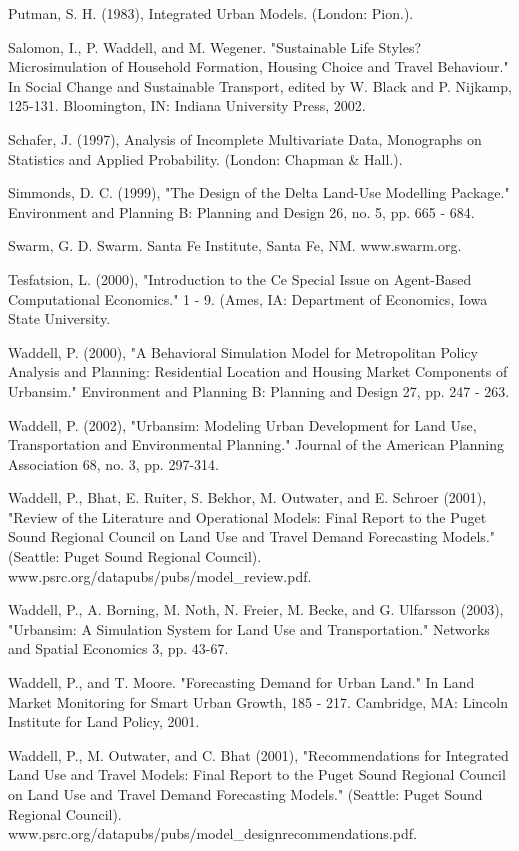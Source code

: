 Putman, S. H. (1983), Integrated Urban Models. (London: Pion.).

Salomon, I., P. Waddell, and M. Wegener. "Sustainable Life Styles? Microsimulation of Household Formation, Housing Choice and Travel Behaviour." In Social Change and Sustainable Transport, edited by W. Black and P. Nijkamp, 125-131. Bloomington, IN: Indiana University Press, 2002.

Schafer, J. (1997), Analysis of Incomplete Multivariate Data, Monographs on Statistics and Applied Probability. (London: Chapman \& Hall.).

Simmonds, D. C. (1999), "The Design of the Delta Land-Use Modelling Package." Environment and Planning B: Planning and Design 26, no. 5, pp. 665 - 684.

Swarm, G. D. Swarm. Santa Fe Institute, Santa Fe, NM. www.swarm.org.

Tesfatsion, L. (2000), "Introduction to the Ce Special Issue on Agent-Based Computational Economics." 1 - 9. (Ames, IA: Department of Economics, Iowa State University.

Waddell, P. (2000), "A Behavioral Simulation Model for Metropolitan Policy Analysis and Planning: Residential Location and Housing Market Components of Urbansim." Environment and Planning B: Planning and Design 27, pp. 247 - 263.

Waddell, P. (2002), "Urbansim: Modeling Urban Development for Land Use, Transportation and Environmental Planning." Journal of the American Planning Association 68, no. 3, pp. 297-314.

Waddell, P., Bhat, E. Ruiter, S. Bekhor, M. Outwater, and E. Schroer (2001), "Review of the Literature and Operational Models: Final Report to the Puget Sound Regional Council on Land Use and Travel Demand Forecasting Models." (Seattle: Puget Sound Regional Council).
 www.psrc.org/datapubs/pubs/model\_review.pdf.

Waddell, P., A. Borning, M. Noth, N. Freier, M. Becke, and G. Ulfarsson (2003), "Urbansim: A Simulation System for Land Use and Transportation." Networks and Spatial Economics 3, pp. 43-67.

Waddell, P., and T. Moore. "Forecasting Demand for Urban Land." In Land Market Monitoring for Smart Urban Growth, 185 - 217. Cambridge, MA: Lincoln Institute for Land Policy, 2001.

Waddell, P., M. Outwater, and C. Bhat (2001), "Recommendations for Integrated Land Use and Travel Models: Final Report to the Puget Sound Regional Council on Land Use and Travel Demand Forecasting Models." (Seattle: Puget Sound Regional Council). www.psrc.org/datapubs/pubs/model\_designrecommendations.pdf.

